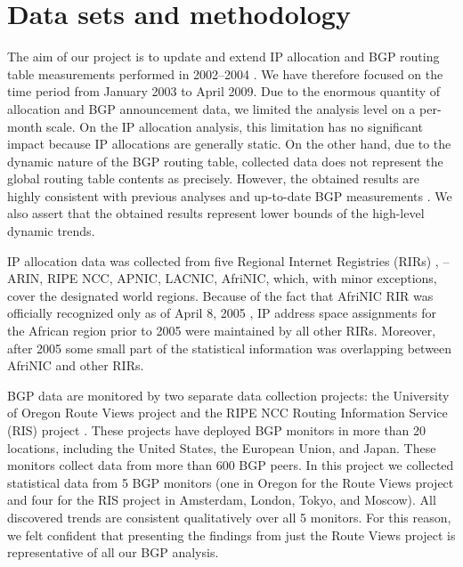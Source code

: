\section{Data sets and methodology}
\label{sec:data sets}

The aim of our project is to update and extend IP allocation and BGP routing
table measurements performed in 2002--2004
\cite{Meng:2003:An-analysis-of-BGP-routing} \cite{Xu:2003:IPv4-Address}
\cite{Meng:2005:IPv4-address}. We have therefore focused on the time period
from January 2003 to April 2009. Due to the enormous quantity of allocation and
BGP announcement data, we limited the analysis level on a per-month scale. On the IP allocation analysis, this limitation has no significant impact because IP allocations are generally static. On the other hand,
due to the dynamic nature of the BGP routing table, collected data does not
represent the global routing table contents as precisely. However, the obtained
results are highly consistent with previous analyses
\cite{Meng:2005:IPv4-address} and up-to-date BGP measurements
\cite{::IPv4-Address-Report}. We also assert that the obtained results
represent lower bounds of the high-level dynamic trends.


IP allocation data was collected from five Regional Internet Registries (RIRs)
\cite{::IANA----Number}, -- ARIN, RIPE NCC, APNIC, LACNIC, AfriNIC, which,
with minor exceptions, cover the designated world regions. Because of the fact that
AfriNIC RIR was officially recognized only as of April 8, 2005
\cite{AKPLOGAN:2005:AfriNIC-now-officially}, IP address space assignments for
the African region prior to 2005 were maintained by all other RIRs. Moreover,
after 2005 some small part of the statistical information was overlapping
between AfriNIC and other RIRs.

BGP data are monitored by two separate data collection projects: the
University of Oregon Route Views project \cite{::Route-Views} and the RIPE NCC
Routing Information Service (RIS) project \cite{::RIS}. These projects have
deployed BGP monitors in more than 20 locations, including the
United States, the European Union, and Japan. These monitors collect data from more
than 600 BGP peers. In this project we collected statistical data from 5
BGP monitors (one in Oregon for the Route Views project and four for the RIS project in Amsterdam,
London, Tokyo, and Moscow). All discovered trends are
consistent qualitatively over all 5 monitors. For this reason, we felt confident that presenting the findings from just the Route Views project is representative of all our BGP analysis.

